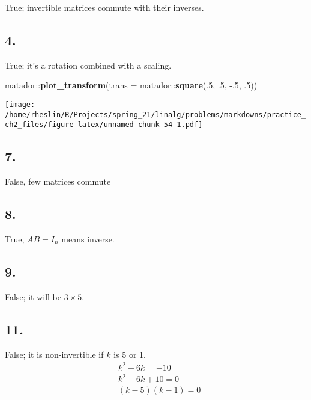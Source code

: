 \documentclass[]{article}
\newenvironment{Shaded}{\begin{snugshade}}{\end{snugshade}}
\newcommand{\DataTypeTok}[1]{\textcolor[rgb]{0.00,0.34,0.68}{#1}}
\newcommand{\DecValTok}[1]{\textcolor[rgb]{0.69,0.50,0.00}{#1}}
\newcommand{\FloatTok}[1]{\textcolor[rgb]{0.69,0.50,0.00}{#1}}
\newcommand{\KeywordTok}[1]{\textcolor[rgb]{0.12,0.11,0.11}{\textbf{#1}}}
\newcommand{\NormalTok}[1]{\textcolor[rgb]{0.12,0.11,0.11}{#1}}
\newcommand{\OperatorTok}[1]{\textcolor[rgb]{0.12,0.11,0.11}{#1}}
\newcommand{\meq}[1]{\begin{split}#1\end{split}}
\begin{document}
True; invertible matrices commute with their inverses.

\hypertarget{section-123}{%
\subsection{4.}\label{section-123}}

True; it's a rotation combined with a scaling.

\begin{Shaded}
\begin{Highlighting}[]
\NormalTok{matador}\OperatorTok{::}\KeywordTok{plot_transform}\NormalTok{(}\DataTypeTok{trans =}\NormalTok{ matador}\OperatorTok{::}\KeywordTok{square}\NormalTok{(.}\DecValTok{5}\NormalTok{, }\FloatTok{.5}\NormalTok{, }\FloatTok{-.5}\NormalTok{, }\FloatTok{.5}\NormalTok{))}
\end{Highlighting}
\end{Shaded}

\texttt{[image: /home/rheslin/R/Projects/spring\_21/linalg/problems/markdowns/practice\_ch2\_files/figure-latex/unnamed-chunk-54-1.pdf]}

\hypertarget{section-124}{%
\subsection{7.}\label{section-124}}

False, few matrices commute

\hypertarget{section-125}{%
\subsection{8.}\label{section-125}}

True, \(AB=I_n\) means inverse.

\hypertarget{section-126}{%
\subsection{9.}\label{section-126}}

False; it will be \(3\times{5}\).

\hypertarget{section-127}{%
\subsection{11.}\label{section-127}}

False; it is non-invertible if \(k\) is 5 or 1. \[\meq{&k^2- 6k = -10\\
&k^2-6k +10 = 0\\
&(k-5)(k-1) =0}\]
\end{document}
